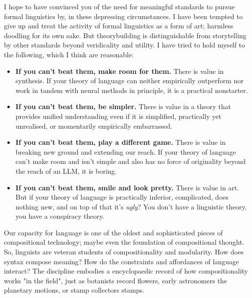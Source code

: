 I hope to have convinced you of the need for meaningful standards to pursue formal linguistics by, in these depressing circumstances. I have been tempted to give up and treat the activity of formal linguistics as a form of art; harmless doodling for its own sake. But theorybuilding is distinguishable from storytelling by other standards beyond veridicality and utility. I have tried to hold myself to the following, which I think are reasonable:

\begin{itemize}
\item{\textbf{If you can't beat them, make room for them.} There is value in synthesis. If your theory of language can neither empirically outperform nor work in tandem with neural methods in principle, it is a practical nonstarter.}
\item{\textbf{If you can't beat them, be simpler.} There is value in a theory that provides unified understanding even if it is simplified, practically yet unrealised, or momentarily empirically embarrassed.}
\item{\textbf{If you can't beat them, play a different game.} There is value in breaking new ground and extending our reach. If your theory of language can't make room and isn't simple and also has no force of originality beyond the reach of an LLM, it is boring.}
\item{\textbf{If you can't beat them, smile and look pretty.} There is value in art. But if your theory of language is practically inferior, complicated, does nothing new, and on top of that it's \emph{ugly}? You don't have a linguistic theory, you have a conspiracy theory.}
\end{itemize}

Our capacity for language is one of the oldest and sophisticated pieces of compositional technology; maybe even the foundation of compositional thought. So, linguists are veteran students of compositionality and modularity. How does syntax compose meaning? How do the constraints and affordances of language interact? The discipline embodies a encyclopaedic record of how compositionality works "in the field", just as botanists record flowers, early astronomers the planetary motions, or stamp collectors stamps.\\

